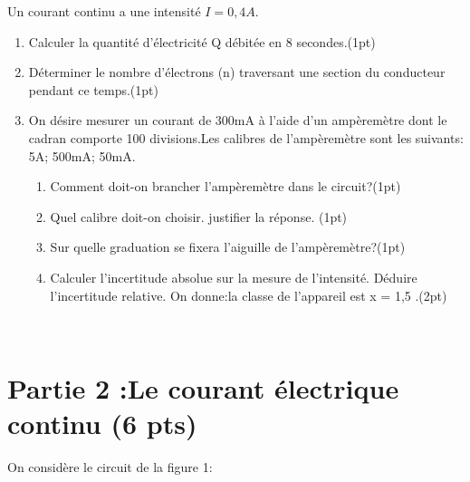 \documentclass[12pt]{article}
\begin{document}
Un courant continu a une intensité $I = 0,4 A$. 
\begin{enumerate}

    \item Calculer la quantité d'électricité Q débitée en 8 secondes.\dotfill(1pt)
    \item Déterminer le nombre d'électrons (n) traversant une section du conducteur pendant ce temps.\dotfill(1pt) 
    \item On désire mesurer un courant de 300mA à l'aide d'un ampèremètre dont le cadran comporte 100 divisions.Les calibres de l'ampèremètre sont les suivants: 5A; 500mA; 50mA. 
        \begin{enumerate}
            \item Comment doit-on brancher l'ampèremètre dans le circuit?\dotfill(1pt) 
            \item Quel calibre doit-on choisir. justifier la réponse. \dotfill(1pt)
            \item Sur quelle graduation se fixera l'aiguille de l'ampèremètre?\dotfill(1pt)
            \item Calculer l’incertitude absolue sur la mesure de l’intensité. Déduire l’incertitude relative. On donne:la classe de l’appareil est x = 1,5 .\dotfill(2pt)
\end{enumerate}
        \end{enumerate}

\hrulefill\\

 \section*{Partie 2 :Le courant électrique continu \dotfill(6 pts)}
On considère le circuit de la figure 1: 
\end{document}
